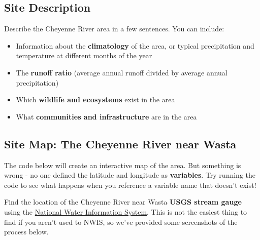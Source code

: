 \documentclass[
  letterpaper,
  DIV=11,
  numbers=noendperiod,
  oneside]{scrreprt}
\providecommand{\tightlist}{%
  \setlength{\itemsep}{0pt}\setlength{\parskip}{0pt}}
\begin{document}
\subsection{Site Description}\label{site-description}

\begin{tcolorbox}[enhanced jigsaw, colbacktitle=quarto-callout-color!10!white, opacityback=0, bottomtitle=1mm, toptitle=1mm, bottomrule=.15mm, left=2mm, colframe=quarto-callout-color-frame, leftrule=.75mm, opacitybacktitle=0.6, colback=white, rightrule=.15mm, toprule=.15mm, breakable, titlerule=0mm, title=\textcolor{quarto-callout-color}{\faInfo}\hspace{0.5em}{Try It}, coltitle=black, arc=.35mm]

Describe the Cheyenne River area in a few sentences. You can include:

\begin{itemize}
\tightlist
\item
  Information about the \textbf{climatology} of the area, or typical
  precipitation and temperature at different months of the year
\item
  The \textbf{runoff ratio} (average annual runoff divided by average
  annual precipitation)
\item
  Which \textbf{wildlife and ecosystems} exist in the area
\item
  What \textbf{communities and infrastructure} are in the area
\end{itemize}

\end{tcolorbox}

\subsection{Site Map: The Cheyenne River near
Wasta}\label{site-map-the-cheyenne-river-near-wasta}

The code below will create an interactive map of the area. But something
is wrong - no one defined the latitude and longitude as
\textbf{variables}. Try running the code to see what happens when you
reference a variable name that doesn't exist!

\begin{tcolorbox}[enhanced jigsaw, colbacktitle=quarto-callout-color!10!white, opacityback=0, bottomtitle=1mm, toptitle=1mm, bottomrule=.15mm, left=2mm, colframe=quarto-callout-color-frame, leftrule=.75mm, opacitybacktitle=0.6, colback=white, rightrule=.15mm, toprule=.15mm, breakable, titlerule=0mm, title=\textcolor{quarto-callout-color}{\faInfo}\hspace{0.5em}{Try It}, coltitle=black, arc=.35mm]

Find the location of the Cheyenne River near Wasta \textbf{USGS stream
gauge} using the \href{https://waterdata.usgs.gov/nwis?}{National Water
Information System}. This is not the easiest thing to find if you aren't
used to NWIS, so we've provided some screenshots of the process below.

\end{tcolorbox}
\end{document}
